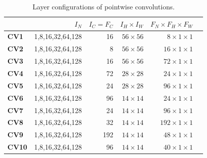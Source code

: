 \begin{table}[]
\setlength{\tabcolsep}{5.2pt}
\caption{Layer configurations of pointwise convolutions.}
\vspace{-3mm}
\label{tab:pwconv}
\begin{threeparttable}
\begin{tabular}{lrrrrr}
\toprule
& \textbf{$I_N$} & \textbf{$I_C=F_C$} & \textbf{$I_H \times I_W$} & \textbf{$F_N \times F_H \times F_W$} \\
\midrule
\textbf{CV1}  & 1,8,16,32,64,128  & 16    & $56\times 56$   & $8 \times 1\times 1$\\
\textbf{CV2}  & 1,8,16,32,64,128  & 8     & $56\times 56$   & $16 \times 1\times 1$\\
\textbf{CV3}  & 1,8,16,32,64,128  & 16    & $56\times 56$   & $72 \times 1\times 1$\\
\textbf{CV4}  & 1,8,16,32,64,128  & 72    & $28\times 28$   & $24 \times 1\times 1$\\
\textbf{CV5}  & 1,8,16,32,64,128  & 24    & $28\times 28$   & $96 \times 1\times 1$\\
\textbf{CV6}  & 1,8,16,32,64,128  & 96    & $14\times 14$   & $24 \times 1\times 1$\\
\textbf{CV7} & 1,8,16,32,64,128  & 24    & $14\times 14$   & $96  \times 1\times 1$\\
\textbf{CV8} & 1,8,16,32,64,128  & 32    & $14\times 14$   & $192 \times 1\times 1$\\
\textbf{CV9} & 1,8,16,32,64,128  & 192   & $14\times 14$   & $48  \times 1\times 1$\\
\textbf{CV10} & 1,8,16,32,64,128  & 96    & $14\times 14$   & $40 \times 1\times 1$\\

\end{tabular}
\end{threeparttable}
\end{table}
